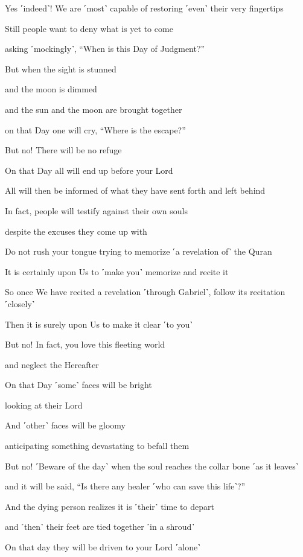 Yes ˹indeed˺! We are ˹most˺ capable of restoring ˹even˺ their very fingertips

Still people want to deny what is yet to come

asking ˹mockingly˺, “When is this Day of Judgment?”

But when the sight is stunned

and the moon is dimmed

and the sun and the moon are brought together

on that Day one will cry, “Where is the escape?”

But no! There will be no refuge

On that Day all will end up before your Lord

All will then be informed of what they have sent forth and left behind

In fact, people will testify against their own souls

despite the excuses they come up with

Do not rush your tongue trying to memorize ˹a revelation of˺ the Quran

It is certainly upon Us to ˹make you˺ memorize and recite it

So once We have recited a revelation ˹through Gabriel˺, follow its recitation ˹closely˺

Then it is surely upon Us to make it clear ˹to you˺

But no! In fact, you love this fleeting world

and neglect the Hereafter

On that Day ˹some˺ faces will be bright

looking at their Lord

And ˹other˺ faces will be gloomy

anticipating something devastating to befall them

But no! ˹Beware of the day˺ when the soul reaches the collar bone ˹as it leaves˺

and it will be said, “Is there any healer ˹who can save this life˺?”

And the dying person realizes it is ˹their˺ time to depart

and ˹then˺ their feet are tied together ˹in a shroud˺

On that day they will be driven to your Lord ˹alone˺

